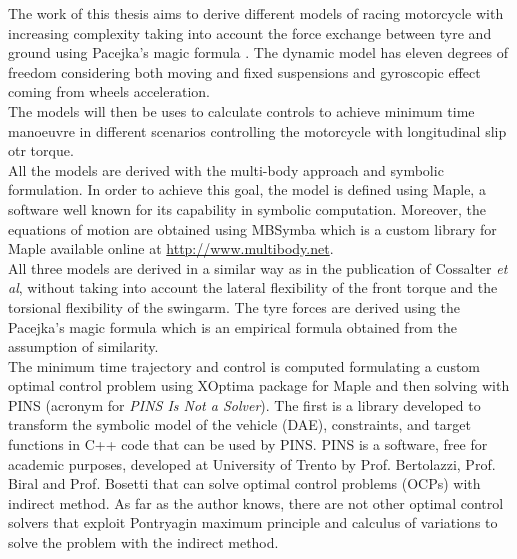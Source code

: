 %
The work of this thesis aims to derive different models of racing motorcycle with increasing complexity taking into account the force exchange between tyre and ground using Pacejka's magic formula \cite{pacejka2006tyre}. The dynamic model has eleven degrees of freedom considering both moving and fixed suspensions and gyroscopic effect coming from wheels acceleration.\\ 
The models will then be uses to calculate controls to achieve minimum time manoeuvre in different scenarios controlling the motorcycle with longitudinal slip otr torque.\\
%
%
All the models are derived with the multi-body approach and symbolic formulation. In order to achieve this goal, the model is defined using Maple, a software well known for its capability in symbolic computation. Moreover, the equations of motion are obtained using MBSymba which is a custom library for Maple available online at \url{http://www.multibody.net}.\\
All three models are derived in a similar way as in the publication of Cossalter \textit{et al}\cite{cossalter2007influence}, without taking into account the lateral flexibility of the front torque and the torsional flexibility of the swingarm. The tyre forces are derived using the Pacejka's magic formula \cite{pacejka2006tyre} which is an empirical formula obtained from the assumption of similarity.\\
The minimum time trajectory and control is computed formulating a custom optimal control problem using XOptima package for Maple and then solving with PINS (acronym for \textit{PINS Is Not a Solver}). The first is a library developed to transform the symbolic model of the vehicle (DAE), constraints, and target functions in C++ code that can be used by PINS. PINS is a software, free for academic purposes, developed at University of Trento by Prof. Bertolazzi, Prof. Biral and Prof. Bosetti that can solve optimal control problems (OCPs) with indirect method. As far as the author knows, there are not other optimal control solvers that exploit Pontryagin maximum principle and calculus of variations to solve the problem with the indirect method. \cite{bertolazzi2006symbolic}\\

